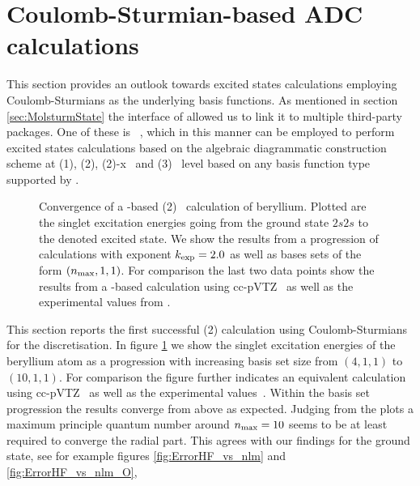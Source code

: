\section{Coulomb-Sturmian-based ADC calculations}
\label{sec:SturmianADC}
This section provides an outlook towards excited states calculations
employing Coulomb-Sturmians as the underlying basis functions.
As mentioned in section \vref{sec:MolsturmState} the \python interface
of \molsturm allowed us to link it to multiple third-party packages.
One of these is \adcman~\cite{Wormit2014},
which in this manner can be employed to perform excited states calculations
based on the algebraic diagrammatic construction scheme at
{\ADC}(1), {\ADC}(2), {\ADC}(2)-x~\cite{Schirmer1982}
and {\ADC}(3)~\cite{Trofimov1999} level
based on any basis function type supported by \molsturm.

\begin{figure}
	\centering
	\caption[
		Convergence of a \CS-based {\ADC}(2) calculation of beryllium
	]{
		Convergence of a \CS-based {\ADC}(2)~\cite{Schirmer1982}
		calculation of beryllium.
		Plotted are the singlet excitation energies
		going from the ground state $2s2s$ to the denoted excited state.
		We show the results from a progression
		of \CS calculations with exponent $k_\text{exp} = 2.0$
		as well as bases sets of the form $(n_\text{max}, 1, 1)$.
		For comparison the last two data points
		show the results from a \cGTO-based calculation
		using cc-pVTZ~\cite{Prascher2011}
		as well as the experimental values from \citet{Moore1949}.
	}
	\label{fig:SturmianAdcResults}
\end{figure}
This section reports the first successful {\ADC}(2)
calculation using Coulomb-Sturmians for the discretisation.
In figure \ref{fig:SturmianAdcResults} we show the singlet excitation energies
of the beryllium atom
as a progression with increasing \CS basis set size from $(4,1,1)$ to $(10,1,1)$.
For comparison the figure further indicates an equivalent calculation
using cc-pVTZ~\cite{Prascher2011} as well as the experimental values~\cite{Moore1949}.
Within the \CS basis set progression the results converge from above as expected.
Judging from the plots
a maximum principle quantum number around $n_\text{max} = 10$
seems to be at least required to converge the radial part.
This agrees with our findings for the ground state,
see for example figures \vref{fig:ErrorHF_vs_nlm} and \vref{fig:ErrorHF_vs_nlm_O},

